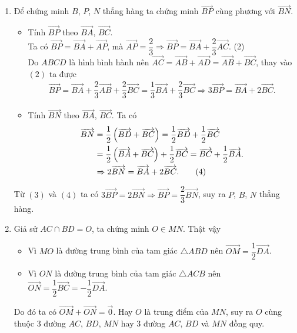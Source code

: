 \begin{bt}
{\begin{enumerate}
			\item Để chứng minh $B$, $P$, $N$ thẳng hàng ta chứng minh $\overrightarrow{BP}$ cùng phương với $\overrightarrow{BN}$.
			\begin{itemize}
				\item Tính $\overrightarrow{BP} $ theo $\overrightarrow{BA}$, $\overrightarrow{BC}$.\\
				Ta có $\overrightarrow{BP} = \overrightarrow{BA} + \overrightarrow{AP}$, mà $\overrightarrow{AP} = \dfrac{2}{3} \Rightarrow \overrightarrow{BP} = \overrightarrow{BA} + \dfrac{2}{3} \overrightarrow{AC}$. \hfill(2)\\
				Do $ABCD$ là hình bình hành nên $\overrightarrow{AC} = \overrightarrow{AB} + \overrightarrow{AD} = \overrightarrow{AB} + \overrightarrow{BC}$, thay vào $(2)$ ta được
				\begin{align}
					\overrightarrow{BP} = \overrightarrow{BA} + \dfrac{2}{3} \overrightarrow{AB} + \dfrac{2}{3} \overrightarrow{BC} = \dfrac{1}{3} \overrightarrow{BA} + \dfrac{2}{3} \overrightarrow{BC} \Rightarrow 3 \overrightarrow{BP} = \overrightarrow{BA} + 2 \overrightarrow{BC}. \tag{3}
				\end{align}
				\item Tính $\overrightarrow{BN} $ theo $\overrightarrow{BA}$, $\overrightarrow{BC}$. Ta có
				\begin{align}
					\overrightarrow{BN} &= \dfrac{1}{2} \left( \overrightarrow{BD} + \overrightarrow{BC} \right) = \dfrac{1}{2} \overrightarrow{BD} + \dfrac{1}{2}  \overrightarrow{BC} \notag\\ &= \dfrac{1}{2} \left( \overrightarrow{BA}+ \overrightarrow{BC} \right) + \dfrac{1}{2} \overrightarrow{BC} = \overrightarrow{BC}+ \dfrac{1}{2} \overrightarrow{BA}. \notag \\
					&\Rightarrow  2 \overrightarrow{BN} = \overrightarrow{BA} + 2 \overrightarrow{BC}. \tag{4}
				\end{align}
			\end{itemize}
			Từ $(3)$ và $(4)$ ta có $3 \overrightarrow{BP} = 2 \overrightarrow{BN} \Rightarrow \overrightarrow{BP} = \dfrac{2}{3} \overrightarrow{BN}$, suy ra $P$, $B$, $N$ thẳng hàng.
			
			\item Giả sử $AC \cap BD = O$, ta chứng minh $O \in MN$. Thật vậy
			\begin{itemize}
				\item Vì $MO$ là đường trung bình của tam giác $\triangle ABD$ nên $\overrightarrow{OM} = \dfrac{1}{2} \overrightarrow{DA}$.
				\item Vì $ON$ là đường trung bình của tam giác $\triangle ACB$ nên $\overrightarrow{ON} = \dfrac{1}{2} \overrightarrow{BC} = - \dfrac{1}{2} \overrightarrow{DA}$.
			\end{itemize}
			Do đó ta có $\overrightarrow{OM}+ \overrightarrow{ON} = \overrightarrow{0}$. Hay $O$ là trung điểm của $MN$, suy ra $O$ cùng thuộc $3$ đường $AC$, $BD$, $MN$ hay $3$ đường $AC$, $BD$ và $MN$ đồng quy.
		\end{enumerate}
	}
\end{bt} 



